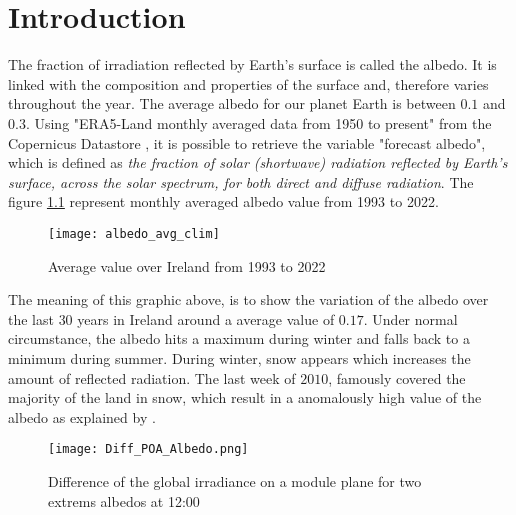 \chapter{Introduction}



The fraction of irradiation reflected by Earth's surface is called the albedo. It is linked with the composition and properties of the surface and, therefore varies throughout the year. The average albedo for our planet Earth is between $0.1$ and $0.3$. Using "ERA5-Land monthly averaged data from 1950 to present" from the Copernicus Datastore \cite{hersbach2020era5}, it is possible to retrieve the variable "forecast albedo", which is defined as \textit{the fraction of solar (shortwave) radiation reflected by Earth's surface, across the solar spectrum, for both direct and diffuse radiation}. The figure \ref{fig:avg_albedo} represent monthly averaged albedo value from 1993 to 2022.  

\begin{figure}[ht]
	\centering
	\texttt{[image: albedo\_avg\_clim]}
	\caption{Average value over Ireland from 1993 to 2022}
	\label{fig:avg_albedo}
\end{figure}


The meaning of this graphic above, is to show the variation of the albedo over the last $30$ years in Ireland around a average value of $0.17$. Under normal circumstance, the albedo hits a maximum during winter and falls back to a minimum during summer. During winter, snow appears which increases the amount of reflected radiation. The last week of $2010$, famously covered the majority of the land in snow, which result in a anomalously high value of the albedo as explained by \cite{garciaclimate2021}. 



\begin{figure}[ht]
	\centering
	\texttt{[image: Diff\_POA\_Albedo.png]}
	\caption{Difference of the global irradiance on a module plane for two extrems albedos at 12:00}
	\label{fig:irradiance_albedo}
\end{figure}